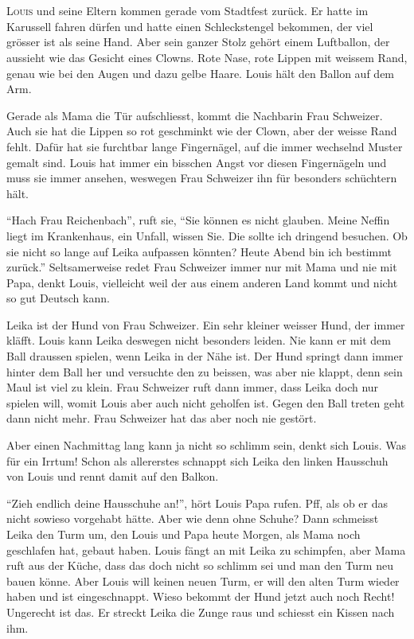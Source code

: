 \chapter*{}
\lettrine[lines=3]{\color{red}L}{ouis} und seine Eltern kommen gerade vom Stadtfest zurück. Er hatte im Karussell fahren dürfen und hatte einen Schleckstengel bekommen, der viel grösser ist als seine Hand. Aber sein ganzer Stolz gehört einem Luftballon, der aussieht wie das Gesicht eines Clowns. Rote Nase, rote Lippen mit weissem Rand, genau wie bei den Augen und dazu gelbe Haare. Louis hält den Ballon auf dem Arm.

Gerade als Mama die Tür aufschliesst, kommt die Nachbarin Frau Schweizer. Auch sie hat die Lippen so rot geschminkt wie der Clown, aber der weisse Rand fehlt. Dafür hat sie furchtbar lange Fingernägel, auf die immer wechselnd Muster gemalt sind. Louis hat immer ein bisschen Angst vor diesen Fingernägeln und muss sie immer ansehen, weswegen Frau Schweizer ihn für besonders schüchtern hält.

\enquote{Hach Frau Reichenbach}, ruft sie, \enquote{Sie können es nicht glauben. Meine Neffin liegt im Krankenhaus, ein Unfall, wissen Sie. Die sollte ich dringend besuchen. Ob sie nicht so lange auf Leika aufpassen könnten? Heute Abend bin ich bestimmt zurück.} Seltsamerweise redet Frau Schweizer immer nur mit Mama und nie mit Papa, denkt Louis, vielleicht weil der aus einem anderen Land kommt und nicht so gut Deutsch kann.

Leika ist der Hund von Frau Schweizer. Ein sehr kleiner weisser Hund, der immer kläfft. Louis kann Leika deswegen nicht besonders leiden. Nie kann er mit dem Ball draussen spielen, wenn Leika in der Nähe ist. Der Hund springt dann immer hinter dem Ball her und versuchte den zu beissen, was aber nie klappt, denn sein Maul ist viel zu klein. Frau Schweizer ruft dann immer, dass Leika doch nur spielen will, womit Louis aber auch nicht geholfen ist. Gegen den Ball treten geht dann nicht mehr. Frau Schweizer hat das aber noch nie gestört.

Aber einen Nachmittag lang kann ja nicht so schlimm sein, denkt sich Louis. Was für ein Irrtum! Schon als allererstes schnappt sich Leika den linken Hausschuh von Louis und rennt damit auf den Balkon.

\enquote{Zieh endlich deine Hausschuhe an!}, hört Louis Papa rufen. Pff, als ob er das nicht sowieso vorgehabt hätte. Aber wie denn ohne Schuhe? Dann schmeisst Leika den Turm um, den Louis und Papa heute Morgen, als Mama noch geschlafen hat, gebaut haben. Louis fängt an mit Leika zu schimpfen, aber Mama ruft aus der Küche, dass das doch nicht so schlimm sei und man den Turm neu bauen könne. Aber Louis will keinen neuen Turm, er will den alten Turm wieder haben und ist eingeschnappt. Wieso bekommt der Hund jetzt auch noch Recht! Ungerecht ist das. Er streckt Leika die Zunge raus und schiesst ein Kissen nach ihm.

